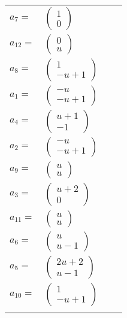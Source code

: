 \documentclass[1p]{elsarticle_modified}
\theoremstyle{definition}
\begin{document}
\begin{tabular}{m{7pt} m{180pt} m{7pt} m{180pt} }
\flushright $a_{7}=$&$\begin{pmatrix}1\\0\end{pmatrix}$ \\
\flushright $a_{12}=$&$\begin{pmatrix}0\\u\end{pmatrix}$ \\
\flushright $a_{8}=$&$\begin{pmatrix}1\\- u+1\end{pmatrix}$ \\
\flushright $a_{1}=$&$\begin{pmatrix}- u\\- u+1\end{pmatrix}$ \\
\flushright $a_{4}=$&$\begin{pmatrix}u+1\\-1\end{pmatrix}$ \\
\flushright $a_{2}=$&$\begin{pmatrix}- u\\- u+1\end{pmatrix}$ \\
\flushright $a_{9}=$&$\begin{pmatrix}u\\u\end{pmatrix}$ \\
\flushright $a_{3}=$&$\begin{pmatrix}u+2\\0\end{pmatrix}$ \\
\flushright $a_{11}=$&$\begin{pmatrix}u\\u\end{pmatrix}$ \\
\flushright $a_{6}=$&$\begin{pmatrix}u\\u-1\end{pmatrix}$ \\
\flushright $a_{5}=$&$\begin{pmatrix}2 u+2\\u-1\end{pmatrix}$ \\
\flushright $a_{10}=$&$\begin{pmatrix}1\\- u+1\end{pmatrix}$\\&\end{tabular}
\end{document}
